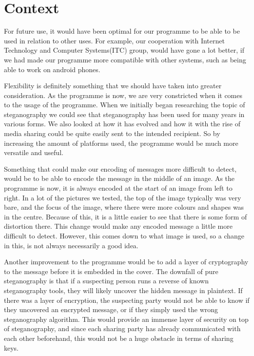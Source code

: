 \section{Context}
For future use, it would have been optimal for our programme to be able to be used in relation to other uses.
For example, our cooperation with Internet Technology and Computer Systems(ITC) group, would have gone a lot better, if we had made our programme more compatible with other systems, such as being able to work on android phones.

Flexibility is definitely something that we should have taken into greater consideration.
As the programme is now, we are very constricted when it comes to the usage of the programme.
When we initially began researching the topic of steganography we could see that steganography has been used for many years in various forms.
We also looked at how it has evolved and how it with the rise of media sharing could be quite easily sent to the intended recipient.
So by increasing the amount of platforms used, the programme would be much more versatile and useful.

Something that could make our encoding of messages more difficult to detect, would be to be able to encode the message in the middle of an image.
As the programme is now, it is always encoded at the start of an image from left to right.
In a lot of the pictures we tested, the top of the image typically was very bare, and the focus of the image, where there were more colours and shapes was in the centre.
Because of this, it is a little easier to see that there is some form of distortion there.
This change would make any encoded message a little more difficult to detect.
However, this comes down to what image is used, so a change in this, is not always necessarily a good idea.

Another improvement to the programme would be to add a layer of cryptography to the message before it is embedded in the cover.
The downfall of pure steganography is that if a suspecting person runs a reverse of known steganography tools, they will likely uncover the hidden message in plaintext.
If there was a layer of encryption, the suspecting party would not be able to know if they uncovered an encrypted message, or if they simply used the wrong steganography algorithm.
This would provide an immense layer of security on top of steganography, and since each sharing party has already communicated with each other beforehand, this would not be a huge obstacle in terms of sharing keys.
